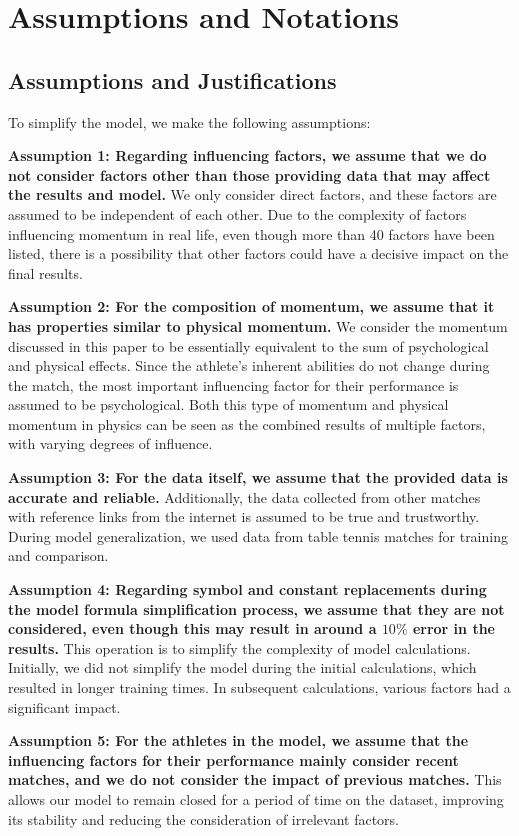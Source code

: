 \section{Assumptions and Notations}
\subsection{Assumptions and Justifications}
To simplify the model, we make the following assumptions:

\textbf{Assumption 1: Regarding influencing factors, we assume that we do not consider factors other than those providing data that may affect the results and model. }We only consider direct factors, and these factors are assumed to be independent of each other. Due to the complexity of factors influencing momentum in real life, even though more than 40 factors have been listed, there is a possibility that other factors could have a decisive impact on the final results.

\textbf{Assumption 2: For the composition of momentum, we assume that it has properties similar to physical momentum.} We consider the momentum discussed in this paper to be essentially equivalent to the sum of psychological and physical effects. Since the athlete's inherent abilities do not change during the match, the most important influencing factor for their performance is assumed to be psychological. Both this type of momentum and physical momentum in physics can be seen as the combined results of multiple factors, with varying degrees of influence.

\textbf{Assumption 3: For the data itself, we assume that the provided data is accurate and reliable. }Additionally, the data collected from other matches with reference links from the internet is assumed to be true and trustworthy. During model generalization, we used data from table tennis matches for training and comparison.

\textbf{Assumption 4: Regarding symbol and constant replacements during the model formula simplification process, we assume that they are not considered, even though this may result in around a \(10\%\) error in the results.} This operation is to simplify the complexity of model calculations. Initially, we did not simplify the model during the initial calculations, which resulted in longer training times. In subsequent calculations, various factors had a significant impact.

\textbf{Assumption 5: For the athletes in the model, we assume that the influencing factors for their performance mainly consider recent matches, and we do not consider the impact of previous matches. }This allows our model to remain closed for a period of time on the dataset, improving its stability and reducing the consideration of irrelevant factors.

